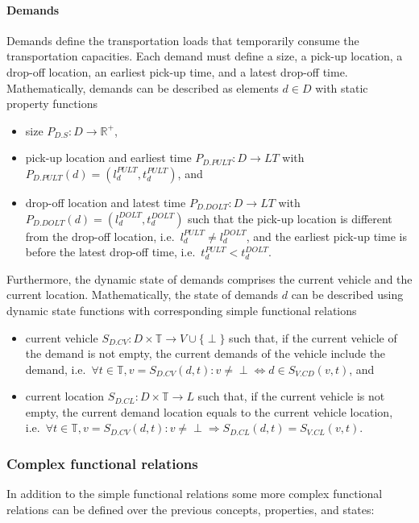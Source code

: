 \documentclass{IEEEtran}
\begin{document}
    \paragraph{Demands}
    Demands define the transportation loads that temporarily consume the transportation capacities.
    Each demand must define a size, a pick-up location, a drop-off location, an earliest pick-up time, and a latest drop-off time.
    Mathematically, demands can be described as elements $d \in D$ with static property functions
    \begin{itemize}
        \item size $P_{D.S}: D \rightarrow \mathbb{R}^+$,
        \item pick-up location and earliest time $P_{D.PULT}: D \rightarrow LT$ with $P_{D.PULT}(d) = (l_d^{PULT},t_d^{PULT})$, and
        \item drop-off location and latest time $P_{D.DOLT}: D \rightarrow LT$ with $P_{D.DOLT}(d) = (l_d^{DOLT},t_d^{DOLT})$ such that the pick-up location is different from the drop-off location, i.e.\ $l_d^{PULT} \neq l_d^{DOLT}$, and the earliest pick-up time is before the latest drop-off time, i.e.\ $t_d^{PULT} < t_d^{DOLT}$.
    \end{itemize}
    Furthermore, the dynamic state of demands comprises the current vehicle and the current location.
    Mathematically, the state of demands $d$ can be described using dynamic state functions with corresponding simple functional relations
    \begin{itemize}
        \item current vehicle $S_{D.CV}: D \times \mathbb{T} \rightarrow V \cup \{\perp\}$ such that, if the current vehicle of the demand is not empty, the current demands of the vehicle include the demand, i.e.\ $\forall t \in \mathbb{T}, v = S_{D.CV}(d,t): v \neq \perp \Leftrightarrow d \in S_{V.CD}(v,t)$, and
        \item current location $S_{D.CL}: D \times \mathbb{T} \rightarrow L$ such that, if the current vehicle is not empty, the current demand location equals to the current vehicle location, i.e.\ $\forall t \in \mathbb{T}, v = S_{D.CV}(d,t): v \neq \perp \Rightarrow S_{D.CL}(d,t)=S_{V.CL}(v,t)$.
    \end{itemize}

    \subsubsection{Complex functional relations}
    In addition to the simple functional relations some more complex functional relations can be defined over the previous concepts, properties, and states:
\end{document}
